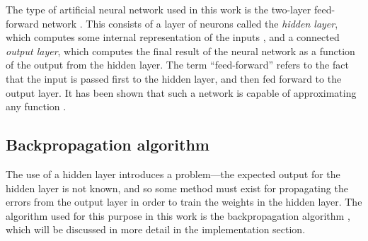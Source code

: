 
The type of artificial neural network used in this work is the two-layer feed-forward network \cite[p. 4]{Aleksander1995}.  This consists of a layer of neurons called the \emph{hidden layer}, which computes some internal representation of the inputs \cite[p. 135]{Aleksander1995}, and a connected \emph{output layer}, which computes the final result of the neural network as a function of the output from the hidden layer.  The term ``feed-forward'' refers to the fact that the input is passed first to the hidden layer, and then fed forward to the output layer.  It has been shown that such a network is capable of approximating any function \cite[p. 10]{Annema1995}.


\subsection{Backpropagation algorithm}

The use of a hidden layer introduces a problem---the expected output for the hidden layer is not known, and so some method must exist for propagating the errors from the output layer in order to train the weights in the hidden layer.  The algorithm used for this purpose in this work is the backpropagation algorithm \cite[p. 134-149]{Aleksander1995}, which will be discussed in more detail in the implementation section.
